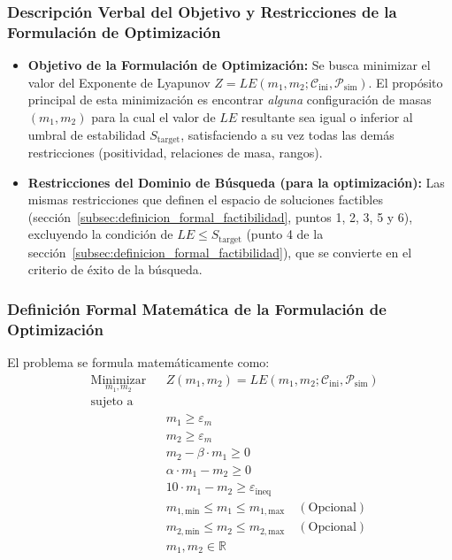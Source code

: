 \subsubsection{Descripción Verbal del Objetivo y Restricciones de la Formulación de Optimización}%
\label{ssubsec:descripcion_verbal_opt}

\begin{itemize}
    \item \textbf{Objetivo de la Formulación de Optimización:}
    Se busca minimizar el valor del Exponente de Lyapunov $Z = LE(m_1, m_2; \mathcal{C}_{\text{ini}}, \mathcal{P}_{\text{sim}})$. El propósito principal de esta minimización es encontrar \textit{alguna} configuración de masas $(m_1, m_2)$ para la cual el valor de $LE$ resultante sea igual o inferior al umbral de estabilidad $S_{\text{target}}$, satisfaciendo a su vez todas las demás restricciones (positividad, relaciones de masa, rangos).

    \item \textbf{Restricciones del Dominio de Búsqueda (para la optimización):}
    Las mismas restricciones que definen el espacio de soluciones factibles (sección~\ref{subsec:definicion_formal_factibilidad}, puntos 1, 2, 3, 5 y 6), excluyendo la condición de $LE \leq S_{\text{target}}$ (punto 4 de la sección~\ref{subsec:definicion_formal_factibilidad}), que se convierte en el criterio de éxito de la búsqueda.
\end{itemize}

\subsubsection{Definición Formal Matemática de la Formulación de Optimización}%
\label{ssubsec:definicion_formal_opt}

El problema se formula matemáticamente como:
\begin{equation}
\begin{aligned}
& \underset{m_1, m_2}{\text{Minimizar}} & & Z(m_1, m_2) = LE(m_1, m_2; \mathcal{C}_{\text{ini}}, \mathcal{P}_{\text{sim}}) \\
& \text{sujeto a} & & \\
& & & m_1 \geq \varepsilon_m \\
& & & m_2 \geq \varepsilon_m \\
& & & m_2 - \beta \cdot m_1 \geq 0 \\
& & & \alpha \cdot m_1 - m_2 \geq 0 \\
& & & 10 \cdot m_1 - m_2 \geq \varepsilon_{\text{ineq}} \\
& & & m_{1,\text{min}} \leq m_1 \leq m_{1,\text{max}} \quad (\text{Opcional}) \\
& & & m_{2,\text{min}} \leq m_2 \leq m_{2,\text{max}} \quad (\text{Opcional}) \\
& & & m_1, m_2 \in \mathbb{R}
\end{aligned}%
\label{eq:problema_optimizacion}
\end{equation}

